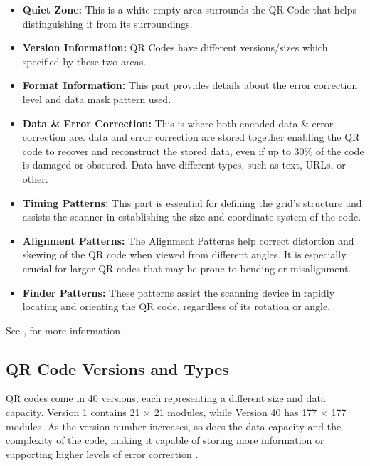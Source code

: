 \begin{itemize}
\item \textbf{Quiet Zone:}
This is a white empty area surrounds the QR Code that helps distinguishing it from its surroundings.

\item \textbf{Version Information:} QR Codes have different versions/sizes which specified by these two areas.

\item \textbf{Format Information:}
This part provides details about the error correction level and data mask pattern used.

\item \textbf{Data \& Error Correction:}
This is where both encoded data \& error correction are. data and error correction are stored together enabling the QR code to recover and reconstruct the stored data, even if up to 30\% of the code is damaged or obscured. Data have different types, such as text, URLs, or other. 

\item \textbf{Timing Patterns:}
This part is essential for defining the grid's structure and assists the scanner in establishing the size and coordinate system of the code.

\item \textbf{Alignment Patterns:}
The Alignment Patterns help correct distortion and skewing of the QR code when viewed from different angles. It is especially crucial for larger QR codes that may be prone to bending or misalignment.

\item \textbf{Finder Patterns:}
These patterns assist the scanning device in rapidly locating and orienting the QR code, regardless of its rotation or angle.
\end{itemize}

See \cite{Tiwari2016}, for more information.

\subsection{QR Code Versions and Types}
QR codes come in 40 versions, each representing a different size and data capacity. Version 1 contains 21 × 21 modules, while Version 40 has 177 × 177 modules. As the version number increases, so does the data capacity and the complexity of the code, making it capable of storing more information or supporting higher levels of error correction \cite{Tiwari2016}. 

